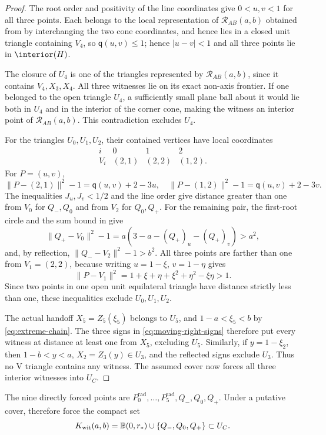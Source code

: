 \begin{proof}
The root order and positivity of the line coordinates give
$0<u,v<1$ for all three points.  Each belongs to the local representation
of $\mathcal R_{AB}(a,b)$ obtained from  by
interchanging the two cone coordinates, and hence
lies in a closed unit triangle containing $V_4$, so
$\mathsf q(u,v)\le1$; hence
$|u-v|<1$ and all three points lie in $\interior(H)$.

The closure of $U_4$ is one of the triangles represented by
$\mathcal R_{AB}(a,b)$, since it contains $V_4,X_3,X_4$.  All three witnesses lie
on its exact non-axis frontier.  If one belonged to the open triangle $U_4$,
a sufficiently small plane ball about it would lie both in $U_4$ and in the
interior of the corner cone, making the witness an interior point of
$\mathcal R_{AB}(a,b)$.  This contradiction excludes $U_4$.

For the triangles $U_0,U_1,U_2$, their contained vertices have local coordinates
\[
 \begin{array}{c|ccc}
 i&0&1&2\\ \hline
 V_i&(2,1)&(2,2)&(1,2).
 \end{array}
\]
For $P=(u,v)$,
\[
 \lVert P-(2,1)\rVert^2-1=\mathsf q(u,v)+2-3u,
 \quad
 \lVert P-(1,2)\rVert^2-1=\mathsf q(u,v)+2-3v.
\]
The inequalities $J_u,J_v<1/2$ and the line order give distance greater than
one from $V_0$ for $Q_-,Q_0$ and from $V_2$ for $Q_0,Q_+$.  For the remaining
pair, the first-root circle and the sum bound in
 give
\[
 \lVert Q_+-V_0\rVert^2-1
 =a(3-a-(Q_+)_u-(Q_+)_v)>a^2,
\]
and, by reflection, $\lVert Q_--V_2\rVert^2-1>b^2$.  All three points are
farther than one from $V_1=(2,2)$, because writing $u=1-\xi$, $v=1-\eta$
gives
\[
 \lVert P-V_1\rVert^2
 =1+\xi+\eta+\xi^2+\eta^2-\xi\eta>1.
\]
Since two points in one open unit equilateral triangle have distance strictly
less than one, these inequalities exclude $U_0,U_1,U_2$.

The actual handoff $X_5=Z_5(\xi_5)$ belongs to $U_5$, and
$1-a<\xi_5<b$ by \eqref{eq:extreme-chain}.  The three signs in
\eqref{eq:moving-right-signs} therefore put every witness at distance at
least one from $X_5$, excluding $U_5$.  Similarly, if $y=1-\xi_2$, then
$1-b<y<a$, $X_2=Z_3(y)\in U_3$, and the reflected signs exclude $U_3$.
Thus no V triangle contains any witness.  The assumed cover now forces all
three interior witnesses into $U_C$.
\end{proof}

The nine directly forced points are
$P_0^{\mathrm{rad}},\ldots,P_5^{\mathrm{rad}},Q_-,Q_0,Q_+$.  Under a
putative cover, 
therefore force the compact set
\begin{equation}
 K_{\rm wit}(a,b)=
 \mathbb B(0,r_*)\cup\{Q_-,Q_0,Q_+\}
 \subset U_C.                                    \label{eq:forced-witness-set}
\end{equation}


